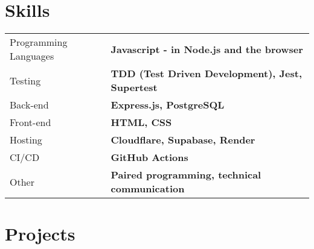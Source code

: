 \documentclass[a4paper,12pt]{article}
\begin{document}

\section{Skills}
\begin{tabularx}{\linewidth}{@{}l X@{}}
    Programming Languages \hspace{10px} & \textbf{Javascript - in Node.js and the browser}        \\
    Testing                             & \textbf{TDD (Test Driven Development), Jest, Supertest} \\
    Back-end                            & \textbf{Express.js, PostgreSQL}                         \\
    Front-end                           & \textbf{HTML, CSS}                                      \\
    Hosting                             & \textbf{Cloudflare, Supabase, Render}                   \\
    CI/CD                               & \textbf{GitHub Actions}                                 \\
    Other                               & \textbf{Paired programming, technical communication}    \\%
\end{tabularx}



\section{Projects}
\end{document}
